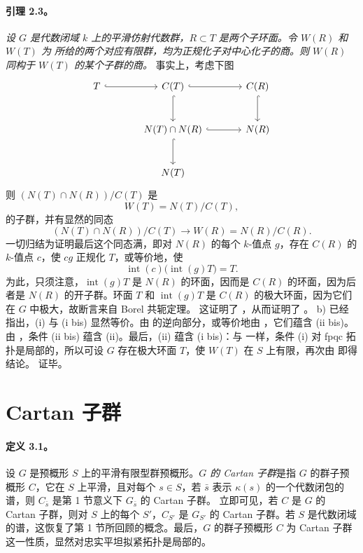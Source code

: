 \paragraph{\textbf{引理 2.3。}}
\emph{设 \(G\) 是代数闭域 \(k\) 上的平滑仿射代数群，\(R\subset T\) 是两个子环面。令 \(W(R)\) 和 \(W(T)\) 为  所给的两个对应有限群，均为正规化子对中心化子的商。则 \(W(R)\) 同构于 \(W(T)\) 的某个子群的商。}
事实上，考虑下图
\[
\begin{tikzcd}[column sep=large,row sep=large]
T \arrow[r, hook] &
C(T) \arrow[r, hook] \arrow[d, hook] &
C(R) \arrow[d, hook] \\
& N(T)\cap N(R) \arrow[r, hook] \arrow[d, hook] &
N(R) \\
& N(T) &
\end{tikzcd}
\]
则 \((N(T)\cap N(R))/C(T)\) 是
\[
  W(T)=N(T)/C(T),
\]
的子群，并有显然的同态
\[
  (N(T)\cap N(R))/C(T)
  \longrightarrow
  W(R)=N(R)/C(R).
\]
一切归结为证明最后这个同态满，即对 \(N(R)\) 的每个 \(k\)-值点 \(g\)，存在 \(C(R)\) 的 \(k\)-值点 \(c\)，使 \(cg\) 正规化 \(T\)，或等价地，使
\[
  \operatorname{int}(c)\bigl(\operatorname{int}(g)T\bigr)=T.
\]
为此，只须注意，\(\operatorname{int}(g)T\) 是 \(N(R)\) 的环面，因而是 \(C(R)\) 的环面，因为后者是 \(N(R)\) 的开子群。环面 \(T\) 和 \(\operatorname{int}(g)T\) 是 \(C(R)\) 的极大环面，因为它们在 \(G\) 中极大，故断言来自 Borel 共轭定理。
这证明了 ，从而证明了 。
b) 已经指出，(i) 与 (i bis) 显然等价。由  的逆向部分，或等价地由 ，它们蕴含 (ii bis)。由 ，条件 (ii bis) 蕴含 (ii)。最后，(ii) 蕴含 (i bis)：与  一样，条件 (i) 对 fpqc 拓扑是局部的，所以可设 \(G\) 存在极大环面 \(T\)，使 \(W(T)\) 在 \(S\) 上有限，再次由  即得结论。 证毕。
\section{Cartan 子群}
\paragraph{\textbf{定义 3.1。}}
设 \(G\) 是预概形 \(S\) 上的平滑有限型群预概形。\emph{\(G\) 的 Cartan 子群}是指 \(G\) 的群子预概形 \(C\)，它在 \(S\) 上平滑，且对每个 \(s\in S\)，若 \(\bar s\) 表示 \(\kappa(s)\) 的一个代数闭包的谱，则 \(C_{\bar s}\) 是第 1 节意义下 \(G_{\bar s}\) 的 Cartan 子群。
立即可见，若 \(C\) 是 \(G\) 的 Cartan 子群，则对 \(S\) 上的每个 \(S'\)，\(C_{S'}\) 是 \(G_{S'}\) 的 Cartan 子群。若 \(S\) 是代数闭域的谱，这恢复了第 1 节所回顾的概念。最后，\(G\) 的群子预概形 \(C\) 为 Cartan 子群这一性质，显然对忠实平坦拟紧拓扑是局部的。
